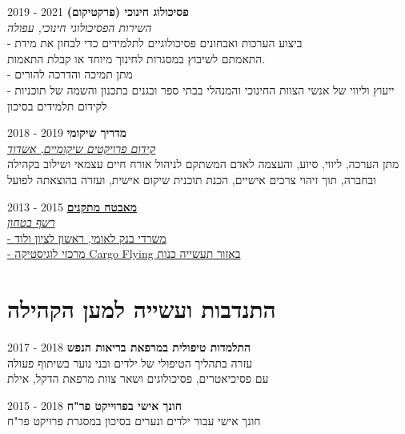 \documentclass[
	12pt,a4paper %
]{article}
\newcommand{\jobentry}[5]{
	{\raggedleft\textsc{#1\expandafter\ifstrequal\expandafter{#2}{}{}{\hspace{6pt}\footnotesize{(#2)}}}\par} %
	\expandafter\ifstrequal\expandafter{#3}{}{}{{\raggedright\large #3}\\} %
	\expandafter\ifstrequal\expandafter{#4}{}{}{{\raggedright\large\textit{\textbf{#4}}}\\[4pt]} %
	\expandafter\ifstrequal\expandafter{#5}{}{}{#5} %
	\medskip %
}
\begin{document}
\begin{hebrew}
\begin{paracol}{2}


\textbf{\large פסיכולוג חינוכי (פרקטיקום)} \hfill 2021 - 2019 \\
\textit{\large השירות הפסיכולוגי חינוכי, עפולה} \\
- ביצוע הערכות ואבחונים פסיכולוגיים לתלמידים כדי לבחון את מידת \\
התאמתם לשיבוץ במסגרות לחינוך מיוחד או קבלת התאמות. \\
- מתן תמיכה והדרכה להורים \\
- ייעוץ וליווי של אנשי הצוות החינוכי והמנהלי בבתי ספר ובגנים בתכנון והשמה של תוכניות לקידום תלמידים בסיכון

\textbf{\large מדריך שיקומי} \hfill 2019 - 2018 \\
\href{http://www.kidumpro.co.il/}{\textit{\large קידום פרויקטים שיקומיים, אשדוד}} \\
מתן הערכה, ליווי, סיוע, והעצמה לאדם המשתקם לניהול אורח חיים עצמאי ושילוב בקהילה ובחברה, תוך זיהוי צרכים אישיים, הכנת תוכנית שיקום אישית, ועזרה בהוצאתה לפועל

\href{https://loona-il.000webhostapp.com/resume-references/recommendation-letter-security-guard.jpg}{\textbf{\large מאבטח מתקנים}} \hfill 2015 - 2013 \\
\textit{\href{https://loona-il.000webhostapp.com/resume-references/recommendation-letter-security-guard.jpg}{\large רשף בטחון}} \\
\href{https://loona-il.000webhostapp.com/resume-references/recommendation-letter-security-guard.jpg}{- משרדי בנק לאומי, ראשון לציון ולוד\\
	- מרכזי לוגיסטיקה Cargo Flying באזור תעשייה כנות}

\section{התנדבות ועשייה למען הקהילה}

\textbf{\large התלמדות טיפולית במרפאת בריאות הנפש} \hfill 2018 - 2017 \\
עזרה בתהליך הטיפולי של ילדים ובני נוער בשיתוף פעולה \\
עם פסיכיאטרים, פסיכולוגים ושאר צוות מרפאת הדקל, אילת

\textbf{\large חונך אישי בפרוייקט פר"ח} \hfill 2018 - 2015 \\
חונך אישי עבור ילדים ונערים בסיכון במסגרת פרויקט פר"ח


\end{paracol} %
\end{hebrew}
\unsetRTL
\end{document}
